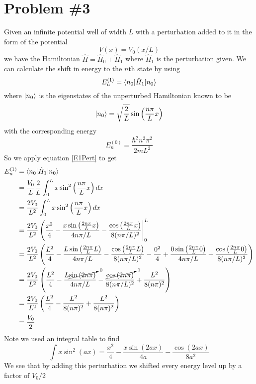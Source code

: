 \documentclass[11pt]{article}
\numberwithin{equation}{section}
\begin{document}
\section{Problem \#3}
Given an infinite potential well of width $L$ with a perturbation added to it in the form of the potential 
$$V(x) = V_0(x/L)$$
we have the Hamiltonian $\hat{H} = \hat{H}_0 + \hat{H}_1$ where $\hat{H}_1$ is the perturbation given. We can calculate the shift in energy to the $n$th state by using
\begin{equation}
E_n^{(1)} = \langle{n_0}|\hat{H}_1|{n_0}\rangle
\label{E1Pert}
\end{equation}
where $|{n_0}\rangle$ is the eigenstates of the unperturbed Hamiltonian known to be
$$|{n_0}\rangle = \sqrt{\frac{2}{L}}\sin\left(\frac{n\pi}{L}x\right)$$
with the corresponding energy
$$E_n^{(0)} = \frac{\hbar^2n^2\pi^2}{2mL^2}$$
So we apply equation \ref{E1Pert} to get
\begin{align*}
E_n^{(1)} &= \langle{n_0}|\hat{H}_1|{n_0}\rangle\\
&= \frac{V_0}{L}\frac{2}{L}\int_{0}^{L}x\sin^2\left(\frac{n\pi}{L}x\right)dx\\
&= \frac{2V_0}{L^2}\int_{0}^{L}x\sin^2\left(\frac{n\pi}{L}x\right)dx\\
&= \frac{2V_0}{L^2}\left(\frac{x^2}{4} - \frac{x\sin\left(\frac{2n\pi}{L}x\right)}{4n\pi/L} - \frac{\cos\left(\frac{2n\pi}{L}x\right)}{8(n\pi/L)^2}\right|_{0}^{L}\\
&= \frac{2V_0}{L^2}\left(\frac{L^2}{4} - \frac{L\sin\left(\frac{2n\pi}{L}L\right)}{4n\pi/L} - \frac{\cos\left(\frac{2n\pi}{L}L\right)}{8(n\pi/L)^2}
- \frac{0^2}{4} + \frac{0\sin\left(\frac{2n\pi}{L}0\right)}{4n\pi/L} + \frac{\cos\left(\frac{2n\pi}{L}0\right)}{8(n\pi/L)^2}\right)\\
&= \frac{2V_0}{L^2}\left(\frac{L^2}{4} - \frac{L\cancelto{0}{\sin\left(2n\pi\right)}}{4n\pi/L} - \frac{\cancelto{1}{\cos\left(2n\pi\right)}}{8(n\pi/L)^2} + \frac{L^2}{8(n\pi)^2}\right)\\
&= \frac{2V_0}{L^2}\left(\frac{L^2}{4} - \frac{L^2}{8(n\pi)^2} + \frac{L^2}{8(n\pi)^2}\right)\\
&= \frac{V_0}{2}
\end{align*}
Note we used an integral table to find
$$\int x\sin^2(ax) = \frac{x^2}{4} - \frac{x\sin(2ax)}{4a} - \frac{\cos(2ax)}{8a^2}$$
We see that by adding this perturbation we shifted every energy level up by a factor of $V_0/2$
\end{document}
